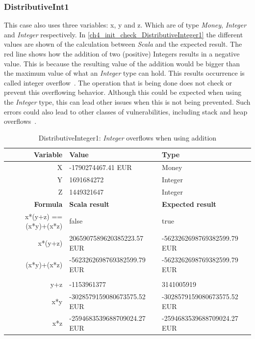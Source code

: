 \subsubsection{DistributiveInt1}
This case also uses three variables: x, y and z. Which are of type \textit{Money}, \textit{Integer} and \textit{Integer} respectively. In \autoref{ch4_init_check_DistributiveInteger1} the different values are shown of the calculation between \textit{Scala} and the expected result. The red line shows how the addition of two (positive) Integers results in a negative value. This is because the resulting value of the addition would be bigger than the maximum value of what an \textit{Integer} type can hold. This results occurrence is called integer overflow~\cite{brumley2007rich}. The operation that is being done does not check or prevent this overflowing behavior. Although this could be expected when using the \textit{Integer} type, this can lead other issues when this is not being prevented. Such errors could also lead to other classes of vulnerabilities, including stack and heap overflows~\cite{wang2009intscope}.
\FloatBarrier
\begin{table}[!ht]
\centering
\begin{tabular}{rll}
\hline
\textbf{Variable}      & \textbf{Value}              & \textbf{Type}               \\ \hline
X                      & -1790274467.41 EUR          & Money                       \\
Y                      & 1691684272                  & Integer                     \\
Z                      & 1449321647                  & Integer                     \\ \hline
\textbf{Formula}       & \textbf{Scala result}       & \textbf{Expected result}    \\ \hline
x*(y+z) == (x*y)+(x*z) & false                       & true                        \\
x*(y+z)                & 2065907589620385223.57 EUR  & -5623262698769382599.79 EUR \\
(x*y)+(x*z)            & -5623262698769382599.79 EUR & -5623262698769382599.79 EUR \\
                       &                             &                             \\
y+z                    & -1153961377                 & 3141005919                  \\
x*y                    & -3028579159080673575.52 EUR & -3028579159080673575.52 EUR \\
x*z                    & -2594683539688709024.27 EUR & -2594683539688709024.27 EUR \\ \hline
\end{tabular}
\caption{DistributiveInteger1: \textit{Integer} overflows when using addition}
\label{ch4_init_check_DistributiveInteger1}
\end{table}
\FloatBarrier

